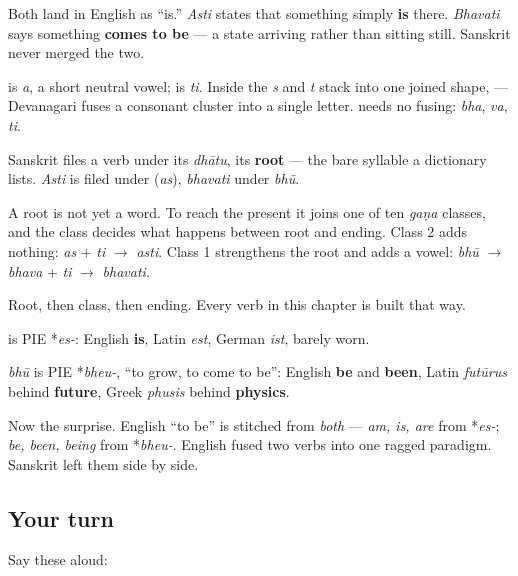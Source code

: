 Both land in English as \textquotedblleft{}is.\textquotedblright{} \emph{Asti} states that something simply \textbf{is} there. \emph{Bhavati} says something \textbf{comes to be} — a state arriving rather than sitting still. Sanskrit never merged the two.

\begin{sounds}
\textbf{} is \emph{a}, a short neutral vowel; \textbf{} is \emph{ti}. Inside \textbf{} the \emph{s} and \emph{t} stack into one joined shape, \textbf{} — Devanagari fuses a consonant cluster into a single letter. \textbf{} needs no fusing: \textbf{} \emph{bha}, \textbf{} \emph{va}, \textbf{} \emph{ti}.
\end{sounds}

\begin{grammarlens}[title={Grammar Lens: the dhātu and its gaṇa}]
Sanskrit files a verb under its \emph{dhātu}, its \textbf{root} — the bare syllable a dictionary lists. \emph{Asti} is filed under \textbf{} (\emph{as}), \emph{bhavati} under \emph{bhū}.

A root is not yet a word. To reach the present it joins one of ten \emph{gaṇa} classes, and the class decides what happens between root and ending. Class 2 adds nothing: \emph{as} + \emph{ti} $\to$ \emph{asti}. Class 1 strengthens the root and adds a vowel: \emph{bhū} $\to$ \emph{bhava} + \emph{ti} $\to$ \emph{bhavati}.

Root, then class, then ending. Every verb in this chapter is built that way.
\end{grammarlens}

\begin{cousinweb}
\textbf{} is PIE *\emph{es-}: English \textbf{is}, Latin \emph{est}, German \emph{ist}, barely worn.

\emph{bhū} is PIE *\emph{bheu-}, \textquotedblleft{}to grow, to come to be\textquotedblright{}: English \textbf{be} and \textbf{been}, Latin \emph{futūrus} behind \textbf{future}, Greek \emph{phusis} behind \textbf{physics}.

Now the surprise. English \textquotedblleft{}to be\textquotedblright{} is stitched from \emph{both} — \emph{am, is, are} from *\emph{es-}; \emph{be, been, being} from *\emph{bheu-}. English fused two verbs into one ragged paradigm. Sanskrit left them side by side.
\end{cousinweb}

\subsection*{Your turn}
Say these aloud:

